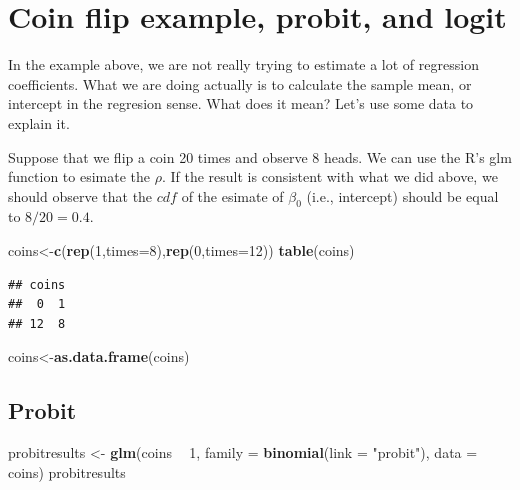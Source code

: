 \documentclass[]{book}
\newenvironment{Shaded}{\begin{snugshade}}{\end{snugshade}}
\newcommand{\KeywordTok}[1]{\textcolor[rgb]{0.13,0.29,0.53}{\textbf{#1}}}
\newcommand{\DataTypeTok}[1]{\textcolor[rgb]{0.13,0.29,0.53}{#1}}
\newcommand{\DecValTok}[1]{\textcolor[rgb]{0.00,0.00,0.81}{#1}}
\newcommand{\StringTok}[1]{\textcolor[rgb]{0.31,0.60,0.02}{#1}}
\newcommand{\OperatorTok}[1]{\textcolor[rgb]{0.81,0.36,0.00}{\textbf{#1}}}
\newcommand{\NormalTok}[1]{#1}
\begin{document}
\section{Coin flip example, probit, and
logit}\label{coin-flip-example-probit-and-logit}

In the example above, we are not really trying to estimate a lot of
regression coefficients. What we are doing actually is to calculate the
sample mean, or intercept in the regresion sense. What does it mean?
Let's use some data to explain it.

Suppose that we flip a coin 20 times and observe 8 heads. We can use the
R's glm function to esimate the \(\rho\). If the result is consistent
with what we did above, we should observe that the \(cdf\) of the
esimate of \(\beta_0\) (i.e., intercept) should be equal to
\(8/20=0.4\).

\begin{Shaded}
\begin{Highlighting}[]
\NormalTok{coins<-}\KeywordTok{c}\NormalTok{(}\KeywordTok{rep}\NormalTok{(}\DecValTok{1}\NormalTok{,}\DataTypeTok{times=}\DecValTok{8}\NormalTok{),}\KeywordTok{rep}\NormalTok{(}\DecValTok{0}\NormalTok{,}\DataTypeTok{times=}\DecValTok{12}\NormalTok{))}
\KeywordTok{table}\NormalTok{(coins)}
\end{Highlighting}
\end{Shaded}

\begin{verbatim}
## coins
##  0  1 
## 12  8
\end{verbatim}

\begin{Shaded}
\begin{Highlighting}[]
\NormalTok{coins<-}\KeywordTok{as.data.frame}\NormalTok{(coins)}
\end{Highlighting}
\end{Shaded}

\subsection{Probit}\label{probit-1}

\begin{Shaded}
\begin{Highlighting}[]
\NormalTok{probitresults <-}\StringTok{ }\KeywordTok{glm}\NormalTok{(coins }\OperatorTok{~}\StringTok{ }\DecValTok{1}\NormalTok{, }\DataTypeTok{family =} \KeywordTok{binomial}\NormalTok{(}\DataTypeTok{link =} \StringTok{"probit"}\NormalTok{), }\DataTypeTok{data =}\NormalTok{ coins)}
\NormalTok{probitresults}
\end{Highlighting}
\end{Shaded}
\end{document}
